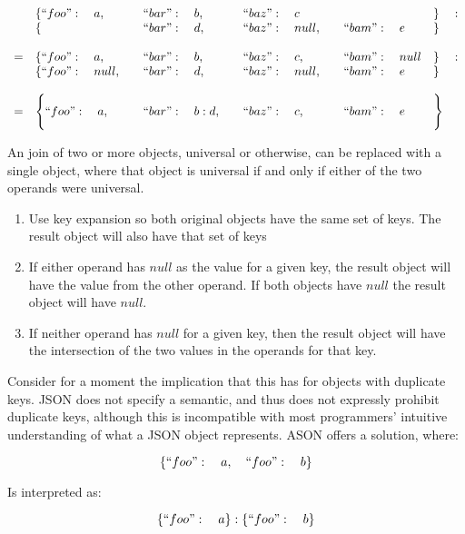\documentclass[letterpaper]{article}
\begin{document}
\begin{prule}
\begin{equation}
\begin{array}{rlllll}
& \{``foo":\quad a,\quad&``bar":\quad b,\quad&``baz":\quad c&&\}\quad:\\
& \{&``bar":\quad d,\quad&``baz":\quad null,\quad&``bam":\quad e&\} \\
\\
=&\{``foo":\quad a,\quad&``bar":\quad b,\quad&``baz":\quad c,\quad&``bam":\quad null&\}\quad:\\
 &\{``foo":\quad null,\quad&``bar":\quad d,\quad&``baz":\quad null,\quad&``bam":\quad e&\} \\
\\
=&\Bigg\{``foo":\quad a,\quad&``bar":\quad b :
d,\quad&``baz":\quad c,\quad&``bam":\quad e&\Bigg\}\\
\end{array}
\end{equation}

An join of two or more objects, universal or otherwise, can be replaced with
a single object, where that object is universal if and only if either of the
two operands were universal.
\begin{enumerate}
\item Use key expansion so both original objects have the same set of keys. The
result object will also have that set of keys
\item If either operand has \(null\) as the value for a given key, the result
object will have the value from the other operand. If both objects have
\(null\) the result object will have \(null\).
\item If neither operand has \(null\) for a given key, then the result object
will have the intersection of the two values in the operands for that key.
\end{enumerate}
\end{prule}

Consider for a moment the implication that this has for objects with duplicate
keys. JSON does not specify a semantic, and thus does not expressly prohibit
duplicate keys, although this is incompatible with most programmers' intuitive
understanding of what a JSON object represents. ASON offers a solution, where:

\begin{equation}
\{``foo":\quad a,\quad``foo":\quad b\}
\end{equation}

Is interpreted as:

\begin{equation}
\{``foo":\quad a\}:\{``foo":\quad b\}
\end{equation}
\end{document}

